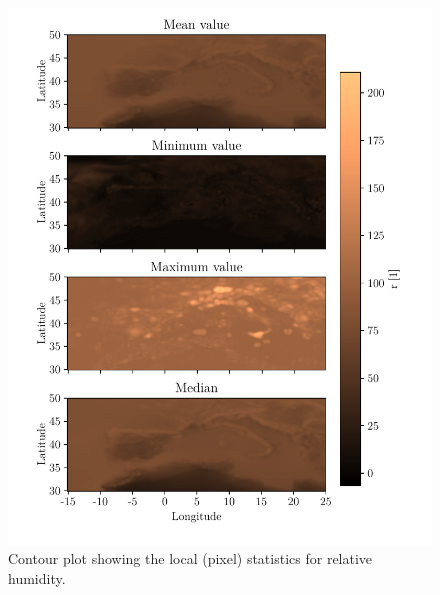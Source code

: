 \begin{figure}[ht]
    \centering
    \includegraphics{python_figs/all_stat_variable_r.pdf}
    \caption{Contour plot showing the local (pixel) statistics for relative humidity.}
    \label{fig:all_stats_r}
\end{figure}

